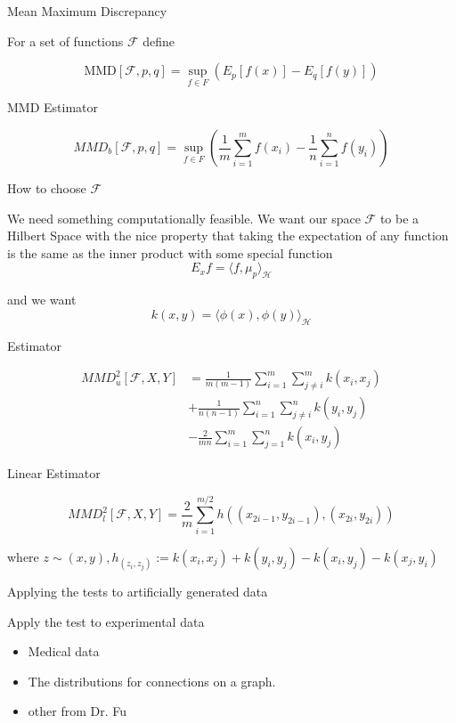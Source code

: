 \documentclass{beamer}
\newcommand{\bi}{\begin{itemize}}
\newcommand{\ei}{\end{itemize}}
\begin{document}
\begin{frame}
{Mean Maximum Discrepancy}

For a set of functions $\mathcal{F}$ define

$$\text{MMD}[\mathcal{F}, p , q] = \sup_{f \in F} ( E_p[f(x)] - E_q[f(y)] )$$
\end{frame}

\begin{frame}
{MMD Estimator}

$$MMD_b [\mathcal{F}, p , q] = \sup_{f \in F} ( \frac 1m \sum_{i = 1}^m f(x_i) - \frac 1n \sum_{i = 1}^n f(y_i) )$$
\end{frame}

\begin{frame}
{How to choose $\mathcal{F}$}

We need something computationally feasible. We want our space $\mathcal{F}$ to be a Hilbert Space with the nice property that taking the expectation of any function is the same as the inner product with some special function 
$$E_xf = \langle f, \mu_p\rangle_\mathcal{H}$$

and we want $$k(x, y) = \langle \phi(x) , \phi(y) \rangle_\mathcal{H}$$

\end{frame}

\begin{frame}{Estimator}

\begin{align*}
{MMD}^2_u[\mathcal{F}, X, Y] &= \frac{1}{m(m-1)}\sum_{i=1}^m\sum_{j \neq i}^m k(x_i, x_j)\\
 &+ \frac{1}{n(n-1)}\sum_{i=1}^n \sum_{j \neq i}^n k(y_i, y_j) \\
 &- \frac{2}{mn}\sum_{i = 1}^m \sum_{j = 1}^n k(x_i, y_j)
\end{align*}  

\end{frame}

\begin{frame}
{Linear Estimator}

$$ {MMD}^2_l[\mathcal{F}, X, Y] = \frac 2m \sum_{i = 1}^{m/2} h((x_{2i -1}, y_{2i - 1}), (x_{2i}, y_{2i}))$$

where $z \sim (x,y), h_(z_i, z_j) := k(x_i, x_j) + k(y_i, y_j) - k(x_i, y_j) - k(x_j, y_i)$
\end{frame}
\begin{frame}{Applying the tests to artificially generated data}
 
\end{frame}

\begin{frame}{Apply the test to experimental data}
 
 \bi
 \item Medical data
 
 \item The distributions for connections on a graph.
 
 \item other from Dr. Fu
 \ei 
\end{frame}
\end{document}
